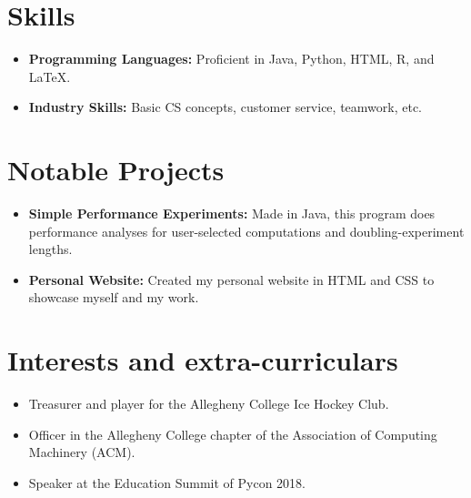 \documentclass[11pt,a4paper,sans]{moderncv}
\begin{document}
\section{Skills}

\vspace{6pt}

\begin{itemize} %
\item \textbf{Programming Languages:} Proficient in Java, Python, HTML, R, and LaTeX.
\vspace{6pt}
\item \textbf{Industry Skills:} Basic CS concepts, customer service, teamwork, etc.
\end{itemize} %


\section{Notable Projects}

\vspace{6pt}

\begin{itemize} %
\item \textbf{Simple Performance Experiments:} Made in Java, this program does performance analyses for user-selected computations and doubling-experiment lengths.
\item \textbf{Personal Website:} Created my personal website in HTML and CSS to showcase myself and my work.
\end{itemize} %


\section{Interests and extra-curriculars}
\vspace{6pt}

\begin{itemize} %
\item{Treasurer and player for the Allegheny College Ice Hockey Club.}
\item{Officer in the Allegheny College chapter of the Association of Computing Machinery (ACM).}
\item{Speaker at the Education Summit of Pycon 2018.}
\end{itemize} %
\end{document}
